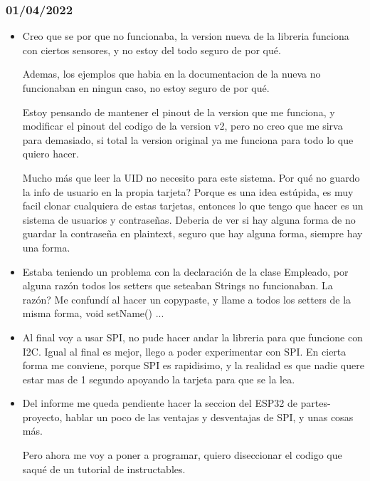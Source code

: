 \documentclass[../informe_krapp.tex]{subfiles}
\begin{document}
\subsubsection*{01/04/2022}
\begin{itemize}
	\item Creo que se por que no funcionaba, la version nueva de la libreria funciona
	      con ciertos sensores, y no estoy del todo seguro de por qué.

	      Ademas, los ejemplos que habia en la documentacion de la nueva no funcionaban en ningun
	      caso, no estoy seguro de por qué.

	      Estoy pensando de mantener el pinout de la version que me funciona, y modificar
	      el pinout del codigo de la version v2, pero no creo que me sirva para demasiado, si
	      total la version original ya me funciona para todo lo que quiero hacer.

	      Mucho más que leer la UID no necesito para este sistema. Por qué no guardo la info
	      de usuario en la propia tarjeta? Porque es una idea estúpida, es muy facil
	      clonar cualquiera de estas tarjetas, entonces lo que tengo que hacer es un sistema de
	      usuarios y contraseñas. Deberia de ver si hay alguna forma de no guardar la contraseña
	      en plaintext, seguro que hay alguna forma, siempre hay una forma.

	\item Estaba teniendo un problema con la declaración de la clase Empleado,
	      por alguna razón todos los setters que seteaban Strings no funcionaban. La razón?
	      Me confundí al hacer un copypaste, y llame a todos los setters
	      de la misma forma, void setName() {...}

	\item Al final voy a usar SPI, no pude hacer andar la libreria para que funcione
	      con I2C. Igual al final es mejor, llego a poder experimentar con SPI.
	      En cierta forma me conviene, porque SPI es rapidisimo, y la realidad es que nadie
	      quere estar mas de 1 segundo apoyando la tarjeta para que se la lea.

	\item Del informe me queda pendiente hacer la seccion del ESP32 de partes-proyecto, hablar un poco
	      de las ventajas y desventajas de SPI, y unas cosas más.

	      Pero ahora me voy a poner a programar, quiero diseccionar el
	      codigo que saqué de un tutorial de instructables.


\end{itemize}
\end{document}
